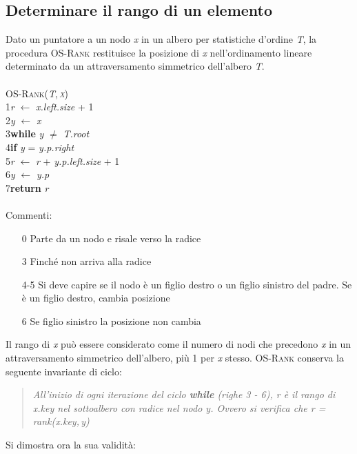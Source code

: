 \documentclass[10pt, a4paper]{report}
\newcommand\firsttab[1][0.5cm]{\hspace*{#1}}
\newcommand\secondtab[1][1cm]{\hspace*{#1}}
\newcommand\thirdtab[1][1.5cm]{\hspace*{#1}}
\begin{document}
\subsection{Determinare il rango di un elemento}
Dato un puntatore a un nodo \textit{x} in un albero per statistiche d'ordine \textit{T}, la procedura \textsc{OS-Rank} restituisce la posizione di \textit{x} nell'ordinamento lineare determinato da un attraversamento simmetrico dell'albero \textit{T}.\\\\
\textsc{OS-Rank(\textit{T},\,\textit{x})}\\
1\firsttab\textit{r} $\leftarrow$ \textit{x.left.size} + 1\\
2\firsttab\textit{y} $\leftarrow$ \textit{x}\\
3\firsttab\textbf{while} \textit{y} $\not=$ \textit{T.root}\\
4\secondtab\textbf{if} \textit{y} = \textit{y.p.right}\\
5\thirdtab\textit{r} $\leftarrow$ \textit{r} + \textit{y.p.left.size} + 1\\
6\secondtab\textit{y} $\leftarrow$ \textit{y.p}\\
7\firsttab\textbf{return} \textit{r}\\\\
Commenti:
\begin{enumerate}
\item[0]Parte da un nodo e risale verso la radice
\item[3]Finché non arriva alla radice
\item[4-5]Si deve capire se il nodo è un figlio destro o un figlio sinistro del padre. Se è un figlio destro, cambia posizione
\item[6]Se figlio sinistro la posizione non cambia
\end{enumerate}
Il rango di \textit{x} può essere considerato come il numero di nodi che precedono \textit{x} in un attraversamento simmetrico dell'albero, più 1 per \textit{x} stesso. \textsc{OS-Rank} conserva la seguente invariante di ciclo:
\begin{quote}
\textit{All'inizio di ogni iterazione del ciclo \textbf{while} (righe 3 - 6), r è il rango di x.key nel sottoalbero con radice nel nodo y. Ovvero  si verifica che r = rank(x.key,\,y)}
\end{quote}
Si dimostra ora la sua validità:
\end{document}
